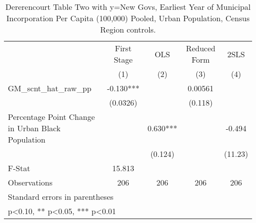 \begin{table}[htbp]\centering
\def\sym#1{\ifmmode^{#1}\else\(^{#1}\)\fi}
\caption{Dererencourt Table Two with y=New Govs, Earliest Year of Municipal Incorporation Per Capita (100,000) Pooled, Urban Population, Census Region controls.}
\begin{tabular}{l*{4}{c}}
\toprule
                    & First Stage   &         OLS   &Reduced Form   &        2SLS   \\
                    &\multicolumn{1}{c}{(1)}   &\multicolumn{1}{c}{(2)}   &\multicolumn{1}{c}{(3)}   &\multicolumn{1}{c}{(4)}   \\
\midrule
GM\_scnt\_hat\_raw\_pp  &      -0.130***&               &     0.00561   &               \\
                    &    (0.0326)   &               &     (0.118)   &               \\
\addlinespace
Percentage Point Change in Urban Black Population&               &       0.630***&               &      -0.494   \\
                    &               &     (0.124)   &               &     (11.23)   \\
\midrule
F-Stat              &      15.813   &               &               &               \\
Observations        &         206   &         206   &         206   &         206   \\
\bottomrule
\multicolumn{5}{l}{\footnotesize Standard errors in parentheses}\\
\multicolumn{5}{l}{\footnotesize * p<0.10, ** p<0.05, *** p<0.01}\\
\end{tabular}
\end{table}
